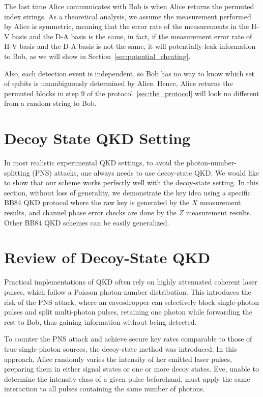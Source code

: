 \documentclass[%
 reprint,
superscriptaddress,
 amsmath,amssymb,
 aps,
]{revtex4-2}
\begin{document}
The last time Alice communicates with Bob is when Alice returns the permuted index strings. As a theoretical analysis, we assume the measurement performed by Alice is symmetric, meaning that the error rate of the measurements in the H-V basis and the D-A basis is the same, in fact, if the measurement error rate of H-V basis and the D-A basis is not the same, it will potentially leak information to Bob, as we will show in Section~\ref{sec:potential_cheating}.

Also, each detection event is independent, so Bob has no way to know which set of qubits is unambiguously determined by Alice. Hence, Alice returns the permuted blocks in step 9 of the protocol~\ref{sec:the_protocol} will look no different from a random string to Bob.

\section{Decoy State QKD Setting}
In most realistic experimental QKD settings, to avoid the photon-number-splitting (PNS) attacks, one always needs to use decoy-state QKD. We would like to show that our scheme works perfectly well with the decoy-state setting. In this section, without loss of generality, we demonstrate the key idea using a specific BB84 QKD protocol where the raw key is generated by the $X$ measurement results, and channel phase error checks are done by the $Z$ measurement results. Other BB84 QKD schemes can be easily generalized.

\section{Review of Decoy-State QKD}
\label{sec:review_decoy_state_qkd}

Practical implementations of QKD often rely on highly attenuated coherent laser pulses, which follow a Poisson photon-number distribution. This introduces the risk of the PNS attack, where an eavesdropper can selectively block single-photon pulses and split multi-photon pulses, retaining one photon while forwarding the rest to Bob, thus gaining information without being detected.

To counter the PNS attack and achieve secure key rates comparable to those of true single-photon sources, the decoy-state method was introduced. In this approach, Alice randomly varies the intensity of her emitted laser pulses, preparing them in either signal states or one or more decoy states. Eve, unable to determine the intensity class of a given pulse beforehand, must apply the same interaction to all pulses containing the same number of photons.
\end{document}
